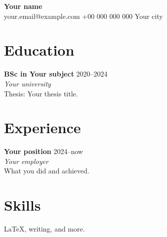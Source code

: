 \documentclass[11pt]{article}
\newcommand{\entry}[4]{%
  \textbf{#2} \hfill #1\\
  \textit{#3}\\
  #4\par\medskip}
\begin{document}
{\LARGE\textbf{Your name}}\\[4pt]
your.email@example.com \quad \textbar \quad +00 000 000 000 \quad \textbar \quad Your city

\section*{Education}
\entry{2020--2024}{BSc in Your subject}{Your university}{Thesis: Your thesis title.}

\section*{Experience}
\entry{2024--now}{Your position}{Your employer}{What you did and achieved.}

\section*{Skills}
\LaTeX, writing, and more.
\end{document}
